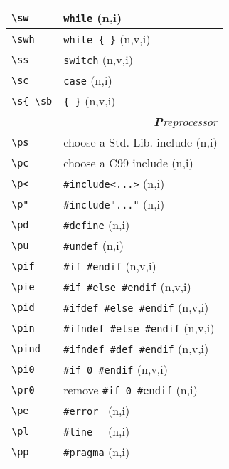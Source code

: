 \documentclass[oneside,11pt,landscape,DIV17]{scrartcl}
\begin{document}
\begin{multicols}{3}
\begin{center}
\begin{tabular}[]{|p{15mm}|p{55mm}|}
\hline \verb'\sw'  & \verb'while'               \hfill (n,i)\\
\hline \verb'\swh' & \verb'while { }'           \hfill (n,v,i)\\
\hline \verb'\ss'  & \verb'switch'              \hfill (n,v,i)\\
\hline \verb'\sc'  & \verb'case'                \hfill (n,i)\\
\hline \verb'\s{ \sb'  & \verb'{ }'             \hfill (n,v,i)\\
\hline
\hline
\multicolumn{2}{|r|}{\textsl{\textbf{P}reprocessor}}   \\
\hline \verb'\ps'   & choose a Std. Lib. include    \hfill (n,i)\\
\hline \verb'\pc'   & choose a C99 include         \hfill (n,i)\\
\hline \verb'\p<'   & \verb$#include<...>$         \hfill (n,i)\\
\hline \verb'\p"'   & \verb$#include"..."$         \hfill (n,i)\\
\hline \verb'\pd'   & \verb'#define'               \hfill (n,i)\\
\hline \verb'\pu'   & \verb'#undef'                \hfill (n,i)\\
\hline \verb'\pif'  & \verb'#if #endif'            \hfill (n,v,i)\\
\hline \verb'\pie'  & \verb'#if #else #endif'      \hfill (n,v,i)\\
\hline \verb'\pid'  & \verb'#ifdef #else #endif'   \hfill (n,v,i)\\
\hline \verb'\pin'  & \verb'#ifndef #else #endif'  \hfill (n,v,i)\\
\hline \verb'\pind' & \verb'#ifndef #def #endif'   \hfill (n,v,i)\\
\hline \verb'\pi0'  & \verb'#if 0 #endif'          \hfill (n,v,i)\\
\hline \verb'\pr0'  & remove \verb'#if 0 #endif'   \hfill (n,i)\\
\hline \verb'\pe'   & \verb'#error '               \hfill (n,i)\\
\hline \verb'\pl'   & \verb'#line  '               \hfill (n,i)\\
\hline \verb'\pp'   & \verb'#pragma'               \hfill (n,i)\\
\hline
\end{tabular} \\


\end{center}
\end{multicols}
\end{document}
